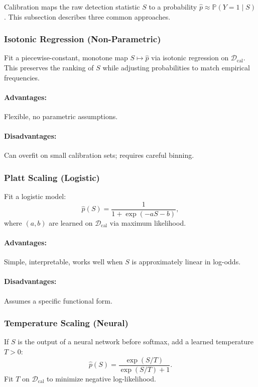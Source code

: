\documentclass[11pt]{article}
\begin{document}
Calibration maps the raw detection statistic $S$ to a probability $\hat p \approx \mathbb{P}(Y=1 \mid S)$. This subsection describes three common approaches.

\subsubsection{Isotonic Regression (Non-Parametric)}

Fit a piecewise-constant, monotone map $S \mapsto \hat p$ via isotonic regression on $\mathcal{D}_{\mathrm{cal}}$. This preserves the ranking of $S$ while adjusting probabilities to match empirical frequencies.

\paragraph{Advantages:} Flexible, no parametric assumptions.

\paragraph{Disadvantages:} Can overfit on small calibration sets; requires careful binning.

\subsubsection{Platt Scaling (Logistic)}

Fit a logistic model:
\[
\hat p(S) = \frac{1}{1 + \exp(-a S - b)},
\]
where $(a,b)$ are learned on $\mathcal{D}_{\mathrm{cal}}$ via maximum likelihood.

\paragraph{Advantages:} Simple, interpretable, works well when $S$ is approximately linear in log-odds.

\paragraph{Disadvantages:} Assumes a specific functional form.

\subsubsection{Temperature Scaling (Neural)}

If $S$ is the output of a neural network before softmax, add a learned temperature $T>0$:
\[
\hat p(S) = \frac{\exp(S/T)}{\exp(S/T) + 1}.
\]
Fit $T$ on $\mathcal{D}_{\mathrm{cal}}$ to minimize negative log-likelihood.
\end{document}
